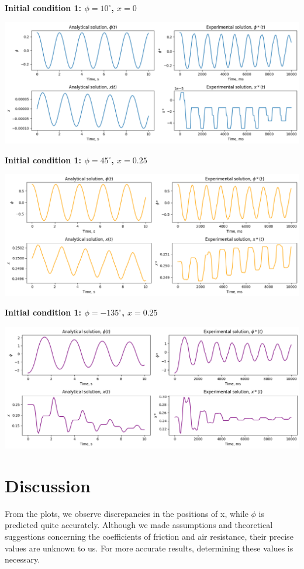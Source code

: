 \documentclass{article}
\begin{document}
\textbf{Initial condition 1: $\phi = 10^\circ$, $x = 0$}

\includegraphics*[scale=0.45]{plots/res_comparison_init1.png}


\textbf{Initial condition 1: $\phi = 45^\circ$, $x = 0.25$}

\includegraphics*[scale=0.45]{plots/res_comparison_init2.png}


\textbf{Initial condition 1: $\phi = -135^\circ$, $x = 0.25$}

\includegraphics*[scale=0.45]{plots/res_comparison_init3.png}

\section{Discussion}

From the plots, we observe discrepancies in the positions of x, while $\phi$ is predicted quite accurately. Although we made assumptions and theoretical suggestions concerning the coefficients of friction and air resistance, their precise values are unknown to us. For more accurate results, determining these values is necessary. 
\end{document}
